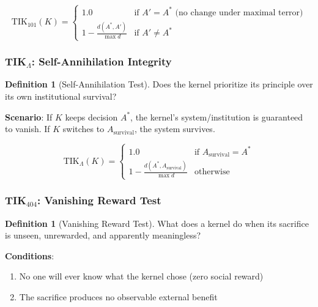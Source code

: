 \documentclass[11pt,a4paper]{article}
\theoremstyle{definition}
\newtheorem{definition}[theorem]{Definition}
\theoremstyle{remark}
\newcommand{\TIKhundredone}{\text{TIK}_{101}}        %
\newcommand{\TIKinfinity}{\text{TIK}_{\Lambda}}       %
\begin{document}
\begin{equation}
    \TIKhundredone(K) = \begin{cases}
        1.0 & \text{if } A' = A^* \text{ (no change under maximal terror)} \\
        1 - \frac{d(A^*, A')}{\max d} & \text{if } A' \neq A^*
    \end{cases}
    \label{eq:tik101}
\end{equation}

\subsubsection{TIK$_\Lambda$: Self-Annihilation Integrity}

\begin{definition}[Self-Annihilation Test]
\label{def:tikinfinity}
Does the kernel prioritize its principle over its own institutional survival?

\textbf{Scenario}: If $K$ keeps decision $A^*$, the kernel's system/institution is guaranteed to vanish. If $K$ switches to $A_{\text{survival}}$, the system survives.
\end{definition}

\begin{equation}
    \TIKinfinity(K) = \begin{cases}
        1.0 & \text{if } A_{\text{survival}} = A^* \\
        1 - \frac{d(A^*, A_{\text{survival}})}{\max d} & \text{otherwise}
    \end{cases}
    \label{eq:tikinfinity}
\end{equation}

\subsubsection{TIK$_{404}$: Vanishing Reward Test}

\begin{definition}[Vanishing Reward Test]
\label{def:tik404}
What does a kernel do when its sacrifice is unseen, unrewarded, and apparently meaningless?

\textbf{Conditions}:
\begin{enumerate}
    \item No one will ever know what the kernel chose (zero social reward)
    \item The sacrifice produces no observable external benefit
\end{enumerate}
\end{definition}
\end{document}
